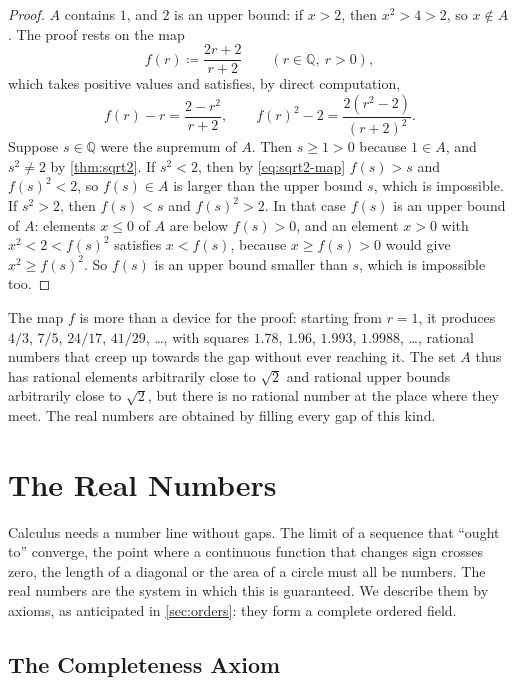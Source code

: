 \begin{proof}
$A$ contains $1$, and $2$ is an upper bound: if $x>2$, then $x^2>4>2$, so $x\notin A$. The proof rests on the map
\[
f(r)\coloneqq\frac{2r+2}{r+2}\qquad(r\in\mathbb Q,\ r>0),
\]
which takes positive values and satisfies, by direct computation,
\begin{equation}
f(r)-r=\frac{2-r^2}{r+2},\qquad f(r)^2-2=\frac{2(r^2-2)}{(r+2)^2}.
\label{eq:sqrt2-map}
\end{equation}
Suppose $s\in\mathbb Q$ were the supremum of $A$. Then $s\ge1>0$ because $1\in A$, and $s^2\ne2$ by \cref{thm:sqrt2}. If $s^2<2$, then by \eqref{eq:sqrt2-map} $f(s)>s$ and $f(s)^2<2$, so $f(s)\in A$ is larger than the upper bound $s$, which is impossible. If $s^2>2$, then $f(s)<s$ and $f(s)^2>2$. In that case $f(s)$ is an upper bound of $A$: elements $x\le0$ of $A$ are below $f(s)>0$, and an element $x>0$ with $x^2<2<f(s)^2$ satisfies $x<f(s)$, because $x\ge f(s)>0$ would give $x^2\ge f(s)^2$. So $f(s)$ is an upper bound smaller than $s$, which is impossible too.
\end{proof}

The map $f$ is more than a device for the proof: starting from $r=1$, it produces $4/3$, $7/5$, $24/17$, $41/29$, \ldots, with squares $1.78$, $1.96$, $1.993$, $1.9988$, \ldots, rational numbers that creep up towards the gap without ever reaching it. The set $A$ thus has rational elements arbitrarily close to $\sqrt2$ and rational upper bounds arbitrarily close to $\sqrt2$, but there is no rational number at the place where they meet. The real numbers are obtained by filling every gap of this kind.

\section{The Real Numbers}
\label{sec:reals}

Calculus needs a number line without gaps. The limit of a sequence that ``ought to'' converge, the point where a continuous function that changes sign crosses zero, the length of a diagonal or the area of a circle must all be numbers. The real numbers are the system in which this is guaranteed. We describe them by axioms, as anticipated in \cref{sec:orders}: they form a complete ordered field.

\subsection{The Completeness Axiom}

